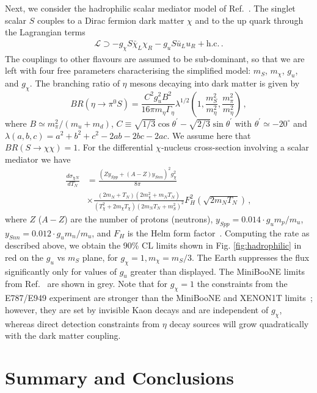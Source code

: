Next, we consider the hadrophilic scalar mediator model of Ref.~\cite{Batell:2018fqo}. The singlet scalar $S$ couples to a Dirac fermion dark matter $\chi$ and to the up quark through the Lagrangian terms
%
\begin{align}
\mathcal{L} \supset -g_\chi S\bar{\chi}_L \chi_R - g_u S \bar{u}_L u_R + \text{h.c.} \, .
\end{align}
%
The couplings to other flavours are assumed to be sub-dominant, so that we are left with four free parameters characterising the simplified model: $m_S$, $m_\chi$, $g_u$, and $g_\chi$. The branching ratio of $\eta$ mesons decaying into dark matter is given by 
%
\begin{equation}
BR(\eta \to \pi^0 S) = \frac{C^2 g_u^2 B^2}{16\pi m_\eta \Gamma_\eta} \lambda^{1/2}\left(1, \frac{m_S^2}{m_\eta^2}, \frac{m_\pi^2}{m_\eta^2}\right) \, ,
\end{equation}
%
where $B \simeq m_\pi^2/(m_u+m_d)$, $C \equiv \sqrt{1/3} \cos\theta^\prime -\sqrt{2/3} \sin\theta^\prime$ with $\theta^\prime \simeq -20^\circ$ and $\lambda(a,b,c) = a^2 + b^2 + c^2 -2ab - 2bc - 2ac$. We assume here that $BR(S \to \chi \chi) = 1$. For the differential $\chi$-nucleus cross-section involving a scalar mediator we have 
%
\begin{align}
\frac{d\sigma_{\chi N}}{dT_N} &= \frac{\left(Z y_{Spp} + (A-Z) y_{Snn}\right)^2 g_\chi^2}{8\pi} \nonumber \\
& \times \frac{(2m_N + T_N) (2 m_\chi^2 + m_N T_N)}{(T_\chi^2 + 2m_\chi T_\chi)(2m_N T_N + m_S^2)^2} F_H^2(\sqrt{2 m_N T_N}) \, ,
\end{align}
%
where $Z$ ($A-Z$) are the number of protons (neutrons), $y_{Spp} = 0.014 \cdot g_u m_p/m_u$, $y_{Snn} = 0.012 \cdot g_u m_n/m_u$, and $F_H$ is the Helm form factor~\cite{Duda:2006uk}. Computing the rate as described above, we obtain the 90\% CL limits shown in Fig. \ref{fig:hadrophilic} in red on the $g_u$ vs $m_S$ plane, for $g_\chi = 1, m_\chi = m_S/3$. The Earth suppresses the flux significantly only for values of $g_u$ greater than displayed. The MiniBooNE limits from Ref.~\cite{Batell:2018fqo} are shown in grey. Note that for $g_\chi=1$ the constraints from the E787/E949 experiment are stronger than the MiniBooNE and XENON1T limits~\cite{Batell:2018fqo}; however, they are set by invisible Kaon decays and are independent of $g_\chi$, whereas direct detection constraints from $\eta$ decay sources will grow quadratically with the dark matter coupling.

\section{Summary and Conclusions}

